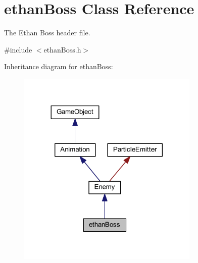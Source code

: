 \hypertarget{classethan_boss}{\section{ethan\+Boss Class Reference}
\label{classethan_boss}
}


The Ethan Boss header file.  




{\ttfamily \#include $<$ethan\+Boss.\+h$>$}



Inheritance diagram for ethan\+Boss\+:\nopagebreak
\begin{figure}[H]
\begin{center}
\leavevmode
\includegraphics[width=245pt]{classethan_boss__inherit__graph}
\end{center}
\end{figure}



